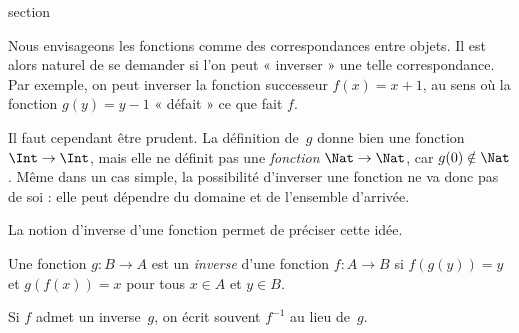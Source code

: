 \documentclass[11pt,a4paper,openany]{memoir}
\begin{document}
\endgroup



\begingroup
\expandafter\def\csname ol@sectioncs\endcsname{section}
\def\olfilename{inverses}



\begin{explain}
Nous envisageons les fonctions comme des correspondances entre objets.
Il est alors naturel de se demander si l’on peut « inverser » une telle
correspondance. Par exemple, on peut inverser la fonction successeur
$f(x) = x + 1$, au sens où la fonction $g(y) = y - 1$ « défait »
ce que fait $f$.

Il faut cependant être prudent. La définition de~$g$ donne bien une
fonction $\Int \to \Int$, mais elle ne définit pas une \emph{fonction}
$\Nat \to \Nat$, car $g(0) \notin \Nat$. Même dans un cas simple,
la possibilité d’inverser une fonction ne va donc pas de soi :
elle peut dépendre du domaine et de l’ensemble d’arrivée.

La notion d’inverse d’une fonction permet de préciser cette idée.
\end{explain}

\begin{defn}
Une fonction $g\colon B \to A$ est un \emph{inverse} d’une fonction
$f\colon A \to B$ si $f(g(y)) = y$ et $g(f(x)) = x$ pour tous
$x \in A$ et $y \in B$.
\end{defn}

Si $f$ admet un inverse~$g$, on écrit souvent $f^{-1}$ au lieu de~$g$.
\end{document}
